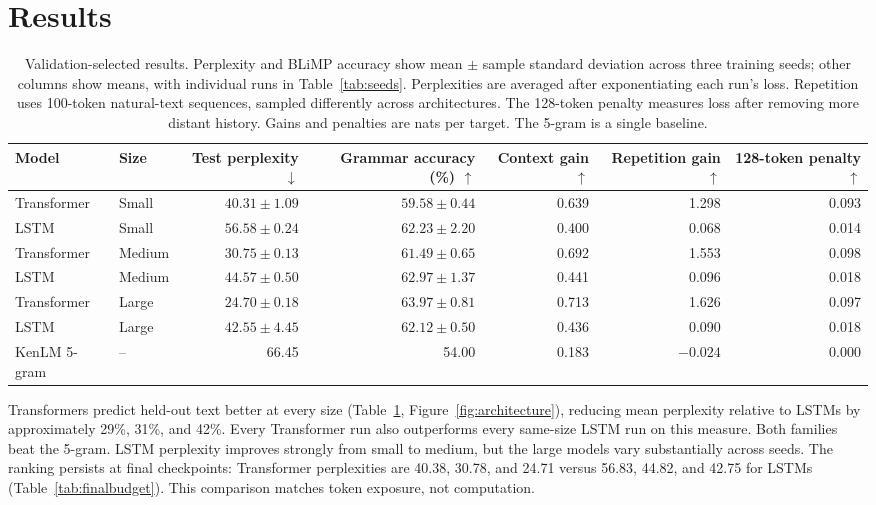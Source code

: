 \documentclass[10pt]{article}
\begin{document}
\section{Results}

\begin{table}[t]
\centering
\small
\setlength{\tabcolsep}{3pt}
\begin{tabular}{llrrrrr}
\toprule
Model & Size & \shortstack{Test\\perplexity $\downarrow$} & \shortstack{Grammar\\accuracy (\%) $\uparrow$} & \shortstack{Context\\gain $\uparrow$} & \shortstack{Repetition\\gain $\uparrow$} & \shortstack{128-token\\penalty $\uparrow$} \\
\midrule
Transformer & Small & $40.31\pm1.09$ & $59.58\pm0.44$ & 0.639 & 1.298 & 0.093 \\
LSTM & Small & $56.58\pm0.24$ & $62.23\pm2.20$ & 0.400 & 0.068 & 0.014 \\
Transformer & Medium & $30.75\pm0.13$ & $61.49\pm0.65$ & 0.692 & 1.553 & 0.098 \\
LSTM & Medium & $44.57\pm0.50$ & $62.97\pm1.37$ & 0.441 & 0.096 & 0.018 \\
Transformer & Large & $24.70\pm0.18$ & $63.97\pm0.81$ & 0.713 & 1.626 & 0.097 \\
LSTM & Large & $42.55\pm4.45$ & $62.12\pm0.50$ & 0.436 & 0.090 & 0.018 \\
\midrule
KenLM 5-gram & -- & 66.45 & 54.00 & 0.183 & $-0.024$ & 0.000 \\
\bottomrule
\end{tabular}
\caption{Validation-selected results. Perplexity and BLiMP accuracy show mean $\pm$ sample standard deviation across three training seeds; other columns show means, with individual runs in Table~\ref{tab:seeds}. Perplexities are averaged after exponentiating each run's loss. Repetition uses 100-token natural-text sequences, sampled differently across architectures. The 128-token penalty measures loss after removing more distant history. Gains and penalties are nats per target. The 5-gram is a single baseline.}
\label{tab:main}
\end{table}

Transformers predict held-out text better at every size (Table~\ref{tab:main}, Figure~\ref{fig:architecture}), reducing mean perplexity relative to LSTMs by approximately 29\%, 31\%, and 42\%. Every Transformer run also outperforms every same-size LSTM run on this measure. Both families beat the 5-gram. LSTM perplexity improves strongly from small to medium, but the large models vary substantially across seeds. The ranking persists at final checkpoints: Transformer perplexities are 40.38, 30.78, and 24.71 versus 56.83, 44.82, and 42.75 for LSTMs (Table~\ref{tab:finalbudget}). This comparison matches token exposure, not computation.
\end{document}
